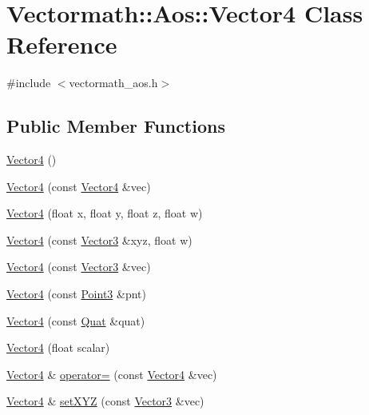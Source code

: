 \hypertarget{classVectormath_1_1Aos_1_1Vector4}{\section{Vectormath\-:\-:Aos\-:\-:Vector4 Class Reference}
\label{classVectormath_1_1Aos_1_1Vector4}
}


{\ttfamily \#include $<$vectormath\-\_\-aos.\-h$>$}

\subsection*{Public Member Functions}
\begin{DoxyCompactItemize}
\item 
\hyperlink{classVectormath_1_1Aos_1_1Vector4_ab35a32f69b0f814200cd241b66f6bdee}{Vector4} ()
\item 
\hyperlink{classVectormath_1_1Aos_1_1Vector4_ae1761e06fb715a8534084780ee52a438}{Vector4} (const \hyperlink{classVectormath_1_1Aos_1_1Vector4}{Vector4} \&vec)
\item 
\hyperlink{classVectormath_1_1Aos_1_1Vector4_ac09d0661fbf9dc152aeff4ff8a82b612}{Vector4} (float x, float y, float z, float w)
\item 
\hyperlink{classVectormath_1_1Aos_1_1Vector4_a4ac563a1165ce004cdb87a7f775f69bc}{Vector4} (const \hyperlink{classVectormath_1_1Aos_1_1Vector3}{Vector3} \&xyz, float w)
\item 
\hyperlink{classVectormath_1_1Aos_1_1Vector4_afb72a4535286458690aa082f6a719d8a}{Vector4} (const \hyperlink{classVectormath_1_1Aos_1_1Vector3}{Vector3} \&vec)
\item 
\hyperlink{classVectormath_1_1Aos_1_1Vector4_a2b63066c1ba1765b74182bce9809f89d}{Vector4} (const \hyperlink{classVectormath_1_1Aos_1_1Point3}{Point3} \&pnt)
\item 
\hyperlink{classVectormath_1_1Aos_1_1Vector4_ac82f824ad63ad57bdc14a5712843ea89}{Vector4} (const \hyperlink{classVectormath_1_1Aos_1_1Quat}{Quat} \&quat)
\item 
\hyperlink{classVectormath_1_1Aos_1_1Vector4_a47edb3b62dbc80a9a84a7eeae42932a1}{Vector4} (float scalar)
\item 
\hyperlink{classVectormath_1_1Aos_1_1Vector4}{Vector4} \& \hyperlink{classVectormath_1_1Aos_1_1Vector4_a7d6ca472f2bbe126648009d7d3c905d7}{operator=} (const \hyperlink{classVectormath_1_1Aos_1_1Vector4}{Vector4} \&vec)
\item 
\hyperlink{classVectormath_1_1Aos_1_1Vector4}{Vector4} \& \hyperlink{classVectormath_1_1Aos_1_1Vector4_ac22f038a90414ec94443a7b47816e3a7}{set\-X\-Y\-Z} (const \hyperlink{classVectormath_1_1Aos_1_1Vector3}{Vector3} \&vec)

\end{DoxyCompactItemize}
